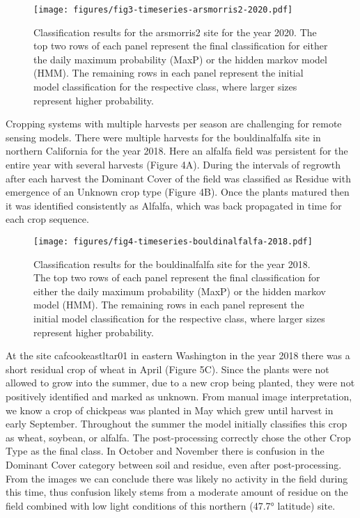 \documentclass{article}
\begin{document}
\begin{figure}[!ht]
    \centering
    \texttt{[image: figures/fig3-timeseries-arsmorris2-2020.pdf]}
    \caption{Classification results for the arsmorris2 site for the year 2020. The top two rows of each panel represent the final classification for either the daily maximum probability (MaxP) or the hidden markov model (HMM). The remaining rows in each panel represent the initial model classification for the respective class, where larger sizes represent higher probability.}
    \label{fig3}
\end{figure}


Cropping systems with multiple harvests per season are challenging for remote sensing models. There were multiple harvests for the bouldinalfalfa site in northern California for the year 2018. Here an alfalfa field was persistent for the entire year with several harvests (Figure 4A). During the intervals of regrowth after each harvest the Dominant Cover of the field was classified as Residue with emergence of an Unknown crop type (Figure 4B). Once the plants matured then it was identified consistently as Alfalfa, which was back propagated in time for each crop sequence.

\begin{figure}[!ht]
    \centering
    \texttt{[image: figures/fig4-timeseries-bouldinalfalfa-2018.pdf]}
    \caption{Classification results for the bouldinalfalfa site for the year 2018. The top two rows of each panel represent the final classification for either the daily maximum probability (MaxP) or the hidden markov model (HMM). The remaining rows in each panel represent the initial model classification for the respective class, where larger sizes represent higher probability.}
    \label{fig4}
\end{figure}

At the site cafcookeastltar01 in eastern Washington in the year 2018 there was a short residual crop of wheat in April (Figure 5C). Since the plants were not allowed to grow into the summer, due to a new crop being planted, they were not positively identified and marked as unknown. From manual image interpretation, we know a crop of chickpeas was planted in May which grew until harvest in early September. Throughout the summer the model initially classifies this crop as wheat, soybean, or alfalfa. The post-processing correctly chose the other Crop Type as the final class. In October and November there is confusion in the Dominant Cover category between soil and residue, even after post-processing. From the images we can conclude there was likely no activity in the field during this time, thus confusion likely stems from a moderate amount of residue on the field combined with low light conditions of this northern (47.7° latitude) site. 
\end{document}
